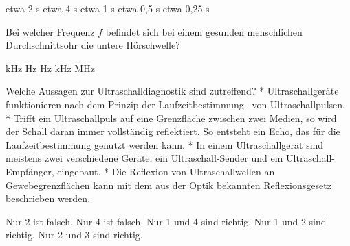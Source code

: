 \documentclass[11pt]{exam}
\begin{document}
\begin{questions}
\begin{choices}
	\choice etwa 2 s
	\choice etwa 4 s
	\choice etwa 1 s
	\choice etwa 0,5 s
	\choice etwa 0,25 s
\end{choices}

\vspace{3mm}\question Bei welcher Frequenz \( f \) befindet sich bei einem gesunden menschlichen Durchschnittsohr die untere Hörschwelle?

\begin{choices}
	 kHz
	 Hz
	 Hz
	 kHz
	 MHz
\end{choices}

\vspace{3mm}\question Welche Aussagen zur Ultraschalldiagnostik sind zutreffend?	* Ultraschallgeräte funktionieren nach dem Prinzip der Laufzeitbestimmung  von Ultraschallpulsen.	* Trifft ein Ultraschallpuls auf eine Grenzfläche zwischen zwei Medien, so wird der Schall daran immer vollständig reflektiert. So entsteht ein Echo, das für die Laufzeitbestimmung genutzt werden kann.	* In einem Ultraschallgerät sind meistens zwei verschiedene Geräte, ein Ultraschall-Sender und ein Ultraschall-Empfänger, eingebaut.	* Die Reflexion von Ultraschallwellen an Gewebegrenzflächen kann mit dem aus der Optik bekannten Reflexionsgesetz beschrieben werden.

\begin{choices}
	\choice Nur 2 ist falsch.
	\choice Nur 4 ist falsch.
	\choice Nur 1 und 4 sind richtig.
	\choice Nur 1 und 2 sind richtig.
	\choice Nur 2 und 3 sind richtig.
\end{choices}

\vspace{3mm}\end{questions}
\end{document}
